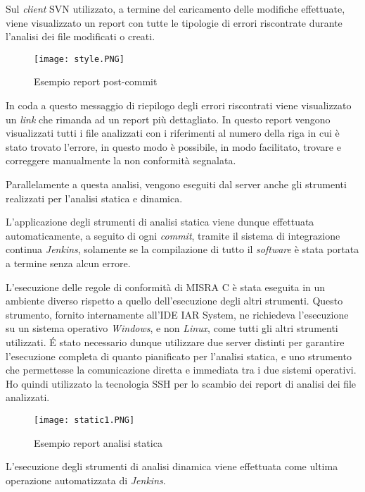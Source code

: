 Sul \textit{client} SVN utilizzato, a termine del caricamento delle modifiche effettuate, viene visualizzato un report con tutte le tipologie di errori riscontrate durante l'analisi dei file modificati o creati.

\begin{figure}[H]
  \centering
  \texttt{[image: style.PNG]}
  \caption{Esempio report post-commit}
\end{figure}

In coda a questo messaggio di riepilogo degli errori riscontrati viene visualizzato un \textit{link} che rimanda ad un report più dettagliato. In questo report vengono visualizzati tutti i file analizzati con i riferimenti al numero della riga in cui è stato trovato l'errore, in questo modo è possibile, in modo facilitato, trovare e correggere manualmente la non conformità segnalata.

\bigskip

Parallelamente a questa analisi, vengono eseguiti dal server anche gli strumenti realizzati per l'analisi statica e dinamica.

L'applicazione degli strumenti di analisi statica viene dunque effettuata automaticamente, a seguito di ogni \textit{commit}, tramite il sistema di integrazione continua \textit{Jenkins}, solamente se la compilazione di tutto il \textit{software} è stata portata a termine senza alcun errore.

L'esecuzione delle regole di conformità di MISRA C è stata eseguita in un ambiente diverso rispetto a quello dell'esecuzione degli altri strumenti. Questo strumento, fornito internamente all'IDE IAR System, ne richiedeva l'esecuzione su un sistema operativo \textit{Windows}, e non \textit{Linux}, come tutti gli altri strumenti utilizzati. É stato necessario dunque utilizzare due server distinti per garantire l'esecuzione completa di quanto pianificato per l'analisi statica, e uno strumento che permettesse la comunicazione diretta e immediata tra i due sistemi operativi. Ho quindi utilizzato la tecnologia SSH per lo scambio dei report di analisi dei file analizzati.

\begin{figure}[H]
  \centering
  \texttt{[image: static1.PNG]}
  \caption{Esempio report analisi statica}
\end{figure}

L'esecuzione degli strumenti di analisi dinamica viene effettuata come ultima operazione automatizzata di \textit{Jenkins}.

